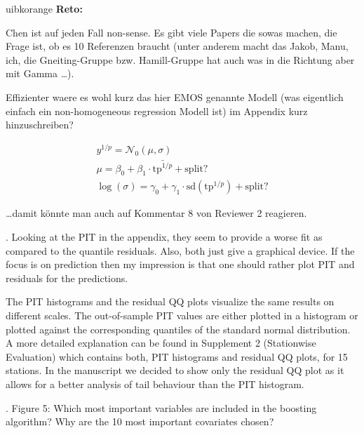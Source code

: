 \documentclass[american,foldmarks=false,noconfig]{uibklttr}
\newenvironment{review}{\fontshape{\itdefault}\fontseries{\bfdefault} \selectfont \smallskip}{\par}
\newenvironment{reto}{
    \begin{color}{uibkorange}
    \textbf{Reto:~}
        \itshape
}{
    \end{color}
}
\begin{document}
\begin{reto}
Chen ist auf jeden Fall non-sense. Es gibt viele Papers die
sowas machen, die Frage ist, ob es 10 Referenzen braucht (unter
anderem macht das Jakob, Manu, ich, die Gneiting-Gruppe bzw.
Hamill-Gruppe hat auch was in die Richtung aber mit Gamma \dots).

Effizienter waere es wohl kurz das hier EMOS genannte Modell (was
eigentlich einfach ein non-homogeneous regression Modell ist)
im Appendix kurz hinzuschreiben?

    \begin{equation}
        \begin{split}
            y^{1/p} = \mathcal{N}_0(\mu, \sigma) \\
            \mu = \beta_0 + \beta_1 \cdot \bar{\mbox{tp}^{1/p}} + \mbox{split?} \\
            \log(\sigma) = \gamma_0 + \gamma_1 \cdot \mbox{sd}(\mbox{tp}^{1/p}) + \mbox{split?}
        \end{split}
    \end{equation}

\dots damit k\"onnte man auch auf Kommentar 8 von Reviewer 2 reagieren.
\end{reto}

\begin{review}
3. Looking at the PIT in the appendix, they seem to provide a 
worse fit as compared to the quantile residuals. Also, both 
just give a graphical device. If the focus is on prediction 
then my impression is that one should rather plot PIT and 
residuals for the predictions.
\end{review}

The PIT histograms and the residual QQ plots visualize the same
results on different scales. The out-of-sample PIT values are 
either plotted in a histogram or plotted against the corresponding
quantiles of the standard normal distribution. A more detailed 
explanation can be found in Supplement 2 (Stationwise Evaluation) 
which contains both, PIT histograms and residual QQ plots, 
for 15 stations. In the manuscript we decided to show only the 
residual QQ plot as it allows for a better analysis of tail 
behaviour than the PIT histogram.


\begin{review}
4. Figure 5: Which most important variables are included in the 
boosting algorithm? Why are the 10 most important covariates chosen?
\end{review}
\end{document}
